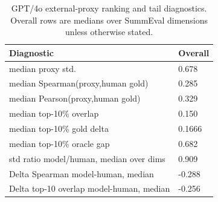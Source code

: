 \begin{table}[t]
\centering
\small
\begin{tabular}{ll}
\toprule
Diagnostic & Overall \\
\midrule
median proxy std. & 0.678 \\
median Spearman(proxy,human gold) & 0.285 \\
median Pearson(proxy,human gold) & 0.329 \\
median top-10\% overlap & 0.150 \\
median top-10\% gold delta & 0.1666 \\
median top-10\% oracle gap & 0.682 \\
std ratio model/human, median over dims & 0.909 \\
Delta Spearman model-human, median & -0.288 \\
Delta top-10 overlap model-human, median & -0.256 \\
\bottomrule
\end{tabular}
\vspace{0.25em}
\caption{GPT/4o external-proxy ranking and tail diagnostics. Overall rows are medians over SummEval dimensions unless otherwise stated.}
\label{tab:gpt-diagnostics}
\end{table}
